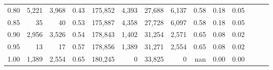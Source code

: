 \begin{tabular}{rrrrrrrrrrrrrr}
0.80 &   5,221 &  3,968 &  0.43 &  175,852 &    4,393 &  27,688 &   6,137 &  0.58 &  0.18 &      0.05 \\
0.85 &      35 &     40 &  0.53 &  175,887 &    4,358 &  27,728 &   6,097 &  0.58 &  0.18 &      0.05 \\
0.90 &   2,956 &  3,526 &  0.54 &  178,843 &    1,402 &  31,254 &   2,571 &  0.65 &  0.08 &      0.02 \\
0.95 &      13 &     17 &  0.57 &  178,856 &    1,389 &  31,271 &   2,554 &  0.65 &  0.08 &      0.02 \\
1.00 &   1,389 &  2,554 &  0.65 &  180,245 &        0 &  33,825 &       0 &   nan &  0.00 &      0.00 \\
\bottomrule
\end{tabular}
